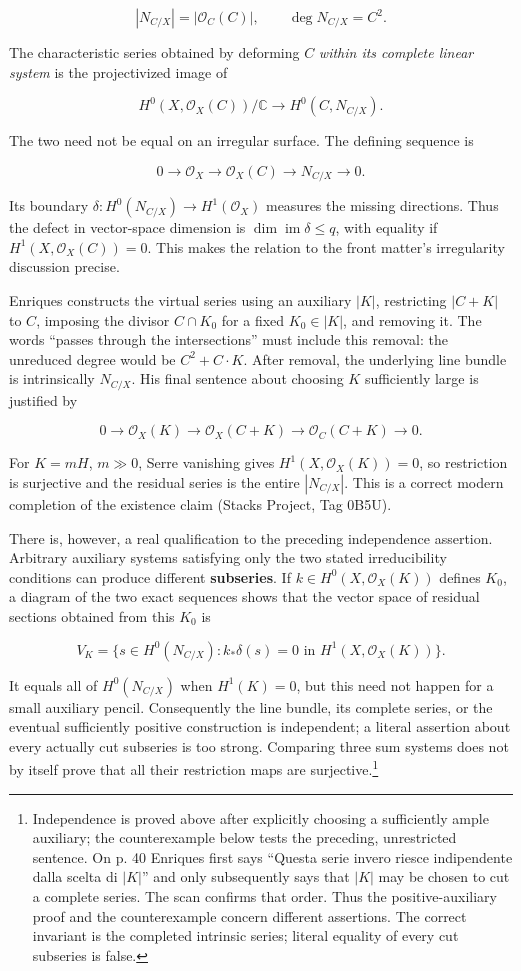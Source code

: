 \[
|N_{C/X}|=|\mathcal O_C(C)|,\qquad \deg N_{C/X}=C^2.
\]

The characteristic series obtained by deforming \(C\) \emph{within its complete linear system} is the projectivized image of

\[
H^0(X,\mathcal O_X(C))/\mathbb C\longrightarrow H^0(C,N_{C/X}).
\]

The two need not be equal on an irregular surface. The defining sequence is

\[
0\to\mathcal O_X\to\mathcal O_X(C)\to N_{C/X}\to0.
\]

Its boundary \(\delta:H^0(N_{C/X})\to H^1(\mathcal O_X)\) measures the missing directions. Thus the defect in vector-space dimension is \(\dim\operatorname{im}\delta\le q\), with equality if \(H^1(X,\mathcal O_X(C))=0\). This makes the relation to the front matter's irregularity discussion precise.

Enriques constructs the virtual series using an auxiliary \(|K|\), restricting \(|C+K|\) to \(C\), imposing the divisor \(C\cap K_0\) for a fixed \(K_0\in|K|\), and removing it. The words ``passes through the intersections'' must include this removal: the unreduced degree would be \(C^2+C\cdot K\). After removal, the underlying line bundle is intrinsically \(N_{C/X}\). His final sentence about choosing \(K\) sufficiently large is justified by

\[
0\to\mathcal O_X(K)\to\mathcal O_X(C+K)
\to\mathcal O_C(C+K)\to0.
\]

For \(K=mH\), \(m\gg0\), Serre vanishing gives \(H^1(X,\mathcal O_X(K))=0\), so restriction is surjective and the residual series is the entire \(|N_{C/X}|\). This is a correct modern completion of the existence claim (Stacks Project, Tag 0B5U).

There is, however, a real qualification to the preceding independence assertion. Arbitrary auxiliary systems satisfying only the two stated irreducibility conditions can produce different \textbf{subseries}. If \(k\in H^0(X,\mathcal O_X(K))\) defines \(K_0\), a diagram of the two exact sequences shows that the vector space of residual sections obtained from this \(K_0\) is

\[
V_K=\{s\in H^0(N_{C/X}):
 k_*\delta(s)=0\text{ in }H^1(X,\mathcal O_X(K))\}.
\]

It equals all of \(H^0(N_{C/X})\) when \(H^1(K)=0\), but this need not happen for a small auxiliary pencil. Consequently the line bundle, its complete series, or the eventual sufficiently positive construction is independent; a literal assertion about every actually cut subseries is too strong. Comparing three sum systems does not by itself prove that all their restriction maps are surjective.\footnote{Independence is proved above after explicitly choosing a sufficiently ample auxiliary; the counterexample below tests the preceding, unrestricted sentence. On p. 40 Enriques first says ``Questa serie invero riesce indipendente dalla scelta di \(|K|\)'' and only subsequently says that \(|K|\) may be chosen to cut a complete series. The scan confirms that order. Thus the positive-auxiliary proof and the counterexample concern different assertions. The correct invariant is the completed intrinsic series; literal equality of every cut subseries is false.}

